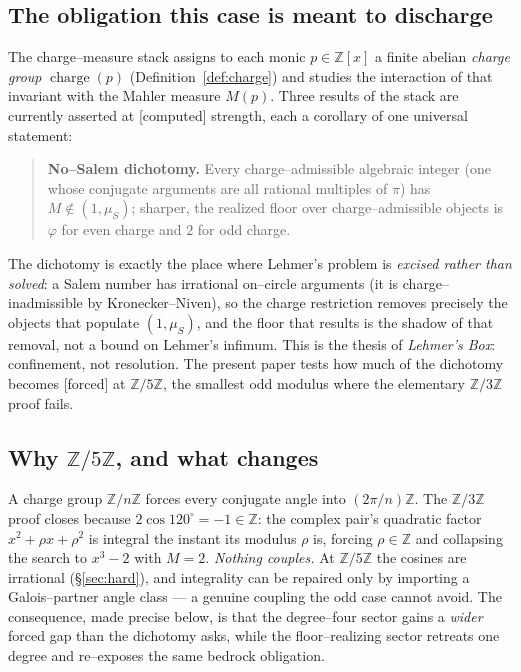\documentclass[11pt]{article}
\newcommand{\forced}{\textcolor{cforced}{\textsf{[forced]}}}
\newcommand{\computed}{\textcolor{ccomp}{\textsf{[computed]}}}
\newcommand{\Z}{\mathbb{Z}}
\newcommand{\Mah}{M}
\newcommand{\muS}{\mu_S}
\newcommand{\Zfive}{\Z/5\Z}
\DeclareMathOperator{\charge}{charge}
\theoremstyle{plain}
\theoremstyle{definition}
\theoremstyle{remark}
\begin{document}
\subsection{The obligation this case is meant to discharge}
The charge--measure stack assigns to each monic $p\in\Z[x]$ a finite abelian \emph{charge group}
$\charge(p)$ (Definition~\ref{def:charge}) and studies the interaction of that invariant with the
Mahler measure $\Mah(p)$. Three results of the stack are currently asserted at \computed{} strength,
each a corollary of one universal statement:

\begin{quote}
\textbf{No--Salem dichotomy.} Every charge--admissible algebraic integer (one whose conjugate
arguments are all rational multiples of $\pi$) has $\Mah\notin(1,\muS)$; sharper, the realized
floor over charge--admissible objects is $\varphi$ for even charge and $2$ for odd charge.
\end{quote}

The dichotomy is exactly the place where Lehmer's problem is \emph{excised rather than solved}: a
Salem number has irrational on--circle arguments (it is charge--inadmissible by Kronecker--Niven),
so the charge restriction removes precisely the objects that populate $(1,\muS)$, and the floor that
results is the shadow of that removal, not a bound on Lehmer's infimum. This is the thesis of
\emph{Lehmer's Box}: confinement, not resolution. The present paper tests how much of the dichotomy
becomes \forced{} at $\Zfive$, the smallest odd modulus where the elementary $\Z/3\Z$ proof fails.

\subsection{Why $\Zfive$, and what changes}
A charge group $\Z/n\Z$ forces every conjugate angle into $(2\pi/n)\Z$. The $\Z/3\Z$ proof closes
because $2\cos120^\circ=-1\in\Z$: the complex pair's quadratic factor $x^2+\rho x+\rho^2$ is integral
the instant its modulus $\rho$ is, forcing $\rho\in\Z$ and collapsing the search to $x^3-2$ with
$\Mah=2$. \emph{Nothing couples.} At $\Zfive$ the cosines are irrational (\S\ref{sec:hard}), and
integrality can be repaired only by importing a Galois--partner angle class --- a genuine coupling
the odd case cannot avoid. The consequence, made precise below, is that the degree--four sector
gains a \emph{wider} forced gap than the dichotomy asks, while the floor--realizing sector retreats
one degree and re--exposes the same bedrock obligation.
\end{document}
